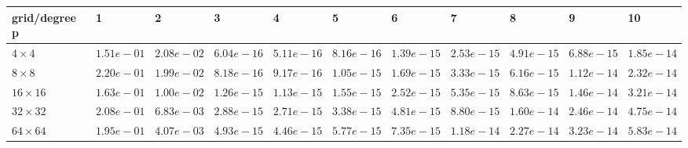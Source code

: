 \begin{tabular}{lllllllllll}
\hline
 grid/degree p   & 1          & 2          & 3          & 4          & 5          & 6          & 7          & 8          & 9          & 10         \\
\hline
 $4 \times 4$    & $1.51e-01$ & $2.08e-02$ & $6.04e-16$ & $5.11e-16$ & $8.16e-16$ & $1.39e-15$ & $2.53e-15$ & $4.91e-15$ & $6.88e-15$ & $1.85e-14$ \\
 $8 \times 8$    & $2.20e-01$ & $1.99e-02$ & $8.18e-16$ & $9.17e-16$ & $1.05e-15$ & $1.69e-15$ & $3.33e-15$ & $6.16e-15$ & $1.12e-14$ & $2.32e-14$ \\
 $16 \times 16$  & $1.63e-01$ & $1.00e-02$ & $1.26e-15$ & $1.13e-15$ & $1.55e-15$ & $2.52e-15$ & $5.35e-15$ & $8.63e-15$ & $1.46e-14$ & $3.21e-14$ \\
 $32 \times 32$  & $2.08e-01$ & $6.83e-03$ & $2.88e-15$ & $2.71e-15$ & $3.38e-15$ & $4.81e-15$ & $8.80e-15$ & $1.60e-14$ & $2.46e-14$ & $4.75e-14$ \\
 $64 \times 64$  & $1.95e-01$ & $4.07e-03$ & $4.93e-15$ & $4.46e-15$ & $5.77e-15$ & $7.35e-15$ & $1.18e-14$ & $2.27e-14$ & $3.23e-14$ & $5.83e-14$ \\
\hline
\end{tabular}